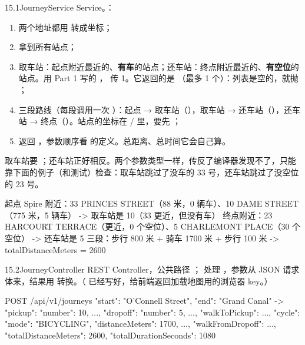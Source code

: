 \begin{task}{15.1\quad JourneyService}
Service。：
\begin{enumerate}
  \item 两个地址都用  转成坐标；
  \item {} 拿到所有站点；
  \item 取车站：起点附近最近的、\textbf{有车}的站点；还车站：终点附近最近的、\textbf{有空位}的站点。用 Part 1 写的 ， 传 1。它返回的是 （最多 1 个）：列表是空的，就抛 ；
  \item 三段路线（每段调用一次 ）：起点 → 取车站（），取车站 → 还车站（），还车站 → 终点（）。站点的坐标在  /  里，要先 ；
  \item 返回 ，参数顺序看  的定义。总距离、总时间它会自己算。
\end{enumerate}

\begin{note}
取车站要 ；还车站正好相反。两个参数类型一样，传反了编译器发现不了，只能靠下面的例子（和测试）检查：取车站跳过了没车的 33 号，还车站跳过了没空位的 23 号。
\end{note}

\begin{example}
\begin{plaincode}
起点 Spire 附近：33 PRINCES STREET（88 米，0 辆车）、10 DAME STREET（775 米，5 辆车）
  -> 取车站是 10（33 更近，但没有车）
终点附近：23 HARCOURT TERRACE（更近，0 个空位）、5 CHARLEMONT PLACE（30 个空位）
  -> 还车站是 5
三段：步行 800 米 + 骑车 1700 米 + 步行 100 米  ->  totalDistanceMeters = 2600
\end{plaincode}
\end{example}
\end{task}

\begin{task}{15.2\quad JourneyController}
REST Controller，公共路径 ； 处理 ，参数从 JSON 请求体来，结果用  转换。（ 已经写好，给前端返回加载地图用的浏览器 key。）

\begin{jsoncode}
POST /api/v1/journeys   {"start": "O'Connell Street", "end": "Grand Canal"}
-> { "pickup": {"number": 10, ...}, "dropoff": {"number": 5, ...},
     "walkToPickup": {...}, "cycle": {"mode": "BICYCLING", "distanceMeters": 1700, ...}, "walkFromDropoff": {...},
     "totalDistanceMeters": 2600, "totalDurationSeconds": 1080 }
\end{jsoncode}
\end{task}

